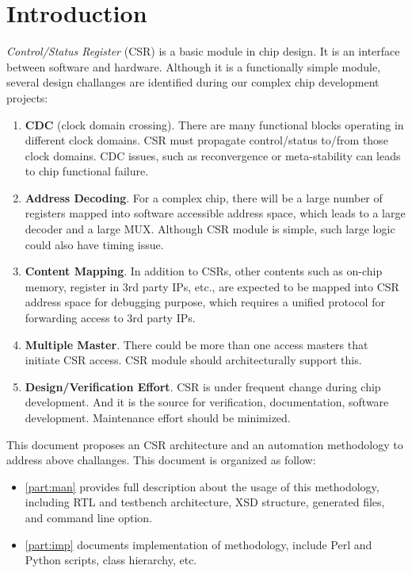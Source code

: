 \documentclass[10pt,oneside]{book}
\begin{document}



\frontmatter
\tableofcontents
\listoftables
\listoffigures

\mainmatter

\chapter{Introduction}\label{sec:chapter intro}
\emph{Control/Status Register} (CSR) is a basic module in chip design. 
It is an interface between software and hardware. Although it is a 
functionally simple module, several design challanges are identified 
during our complex chip development projects:
\begin{enumerate}
\item \textbf{CDC} (clock domain crossing). There are many functional 
  blocks operating in different clock domains. CSR must propagate 
  control/status to/from those clock domains. CDC issues, such as 
  reconvergence or meta-stability can leads to chip functional failure. 

\item \textbf{Address Decoding}. For a complex chip, there will be a 
  large number of registers mapped into software accessible address
  space, which leads to a large decoder and a large MUX. Although CSR
  module is simple, such large logic could also have timing issue. 

\item \textbf{Content Mapping}. In addition to CSRs, other contents 
  such as on-chip memory, register in 3rd party IPs, etc., are expected 
  to be mapped into CSR address space for debugging purpose, which 
  requires a unified protocol for forwarding access to 3rd party IPs.

\item \textbf{Multiple Master}. There could be more than one access masters
  that initiate CSR access. CSR module should architecturally support this. 

\item \textbf{Design/Verification Effort}. CSR is under frequent change
  during chip development. And it is the source for verification, 
  documentation, software development. Maintenance effort should be minimized. 
\end{enumerate}

This document proposes an CSR architecture and an automation methodology to 
address above challanges. This document is organized as follow:
\begin{itemize}
\item \autoref{part:man} provides full description about the usage
  of this methodology, including RTL and testbench architecture, 
  XSD structure, generated files, and command line option. 
\item \autoref{part:imp} documents implementation of methodology, 
include Perl and Python scripts, class hierarchy, etc. 
\end{itemize}
\end{document}
